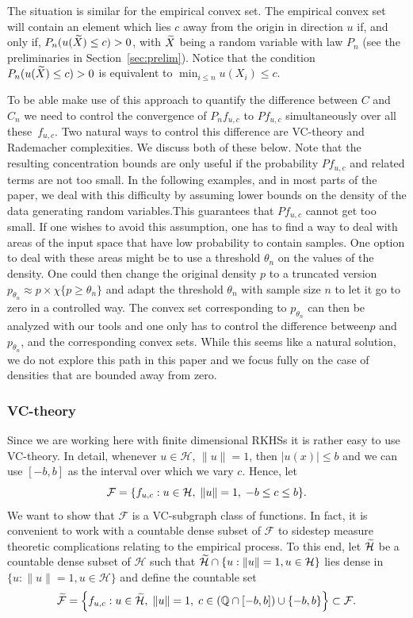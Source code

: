 \documentclass[10pt]{amsart}
\theoremstyle{definition}\newtheorem{defi}[theo]{Definition}\newtheorem{rema}[theo]{Remark}\newtheorem{exam}[theo]{Example}\newtheorem{exem}[theo]{Example}\newtheorem{nota}[theo]{Notation}
\theoremstyle{remark}
\newcommand{\bbQ}{\mathbb{Q}}
\newcommand{\cH}{\mathcal{H}}
\newcommand{\clF}{\mathcal{F}}
\let\oldtilde\tilde
\renewcommand*{\tilde}[1]{\mathchoice{\widetilde{#1}}{\widetilde{#1}}{\oldtilde{#1}}{\oldtilde{#1}}}
\let\originalleft\left
\let\originalright\right
\renewcommand{\left}{\mathopen{}\mathclose\bgroup\originalleft}
\renewcommand{\right}{\aftergroup\egroup\originalright}
\newcounter{setofstep}
\newcounter{step}[setofstep]
\begin{document}
The situation is similar for the empirical convex set. The empirical convex set will contain an element which lies $c$ away from the origin in direction $u$ if, and only if, $P_n(u(\tilde X) \leq c) >0$, with $\tilde X$ being a random variable with law $P_n$ (see the preliminaries in Section~\ref{sec:prelim}). Notice that the condition $P_n(u(\tilde X) \leq c) >0$ is equivalent to $\min_{i\leq n} u(X_i) \leq c$.

To be able make use of this approach to quantify the difference between $C$ and $C_n$ we need to control the convergence of $P_n f_{u,c}$ to $P f_{u,c}$ simultaneously over all these~$f_{u,c}$. Two natural ways to control this difference are VC-theory and Rademacher complexities. We discuss both of these below. Note that the resulting concentration bounds are only useful if the probability $P f_{u,c}$ and related terms are not too small. In the following examples, and in most parts of the paper, we deal with this difficulty by assuming lower bounds on the density of the data generating random variables.\linebreak This guarantees that $P f_{u,c}$ cannot get too small. If one wishes to avoid this assumption, one has to find a way to deal with areas of the input space that have low probability to contain samples. One option to deal with these areas might be to use a threshold $\theta_n$ on the values of the density. One could then change the original density $p$ to a truncated version $p_{\theta_n} \approx p \times \chi\{p \geq \theta_n\}$ and adapt the threshold $\theta_n$ with sample size $n$ to let it go to zero in a controlled way. The convex set corresponding to $p_{\theta_n}$ can then be analyzed with our tools and one only has to control the difference between\linebreak $p$ and $p_{\theta_n}$, and the corresponding convex sets. While this seems like a natural solution, we do not explore this path in this paper and we focus fully on the case of densities that are bounded away from zero.



\subsubsection{VC-theory}
Since we are working here with finite dimensional RKHSs it is rather easy to use VC-theory. In detail, whenever $u \in \cH$, $\|u\| = 1$, then $|u(x)| \leq b$ and we can use $[-b,b]$ as the interval over which we vary $c$. Hence, let
\[
\clF = \left\{f_{u,c} : u \in \cH,\; \|u\|=1, \;-b \leq c \leq b \right \}.
\]
We want to show that $\clF$ is a VC-subgraph class of functions. In fact, it is convenient to work with a countable dense subset of $\clF$ to sidestep measure theoretic complications relating to the empirical process. To this end, let $\tilde{\cH}$ be a countable dense subset of $\cH$ such that $\tilde{\cH} \cap \{u : \|u\|=1,u\in \cH\}$ lies dense in $\{u : \|u\|=1,u \in \cH\}$ and define the countable set
\begin{equation}\label{eq:countableF}
\tilde{\clF} = \left\{f_{u,c} : u \in \tilde{\cH},\; \|u\|=1,\; c \in (\bbQ \cap [-b,b]) \cup \{-b,b\}\right\} \subset \clF.
\end{equation}
\end{document}
